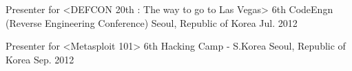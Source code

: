 \begin{cventries}


  \cventry
    {Presenter for <DEFCON 20th : The way to go to Las Vegas>} %
    {6th CodeEngn (Reverse Engineering Conference)} %
    {Seoul, Republic of Korea} %
    {Jul. 2012} %
    {}
  
  \cventry
    {Presenter for <Metasploit 101>} %
    {6th Hacking Camp - S.Korea} %
    {Seoul, Republic of Korea} %
    {Sep. 2012} %
    {}

\end{cventries}
